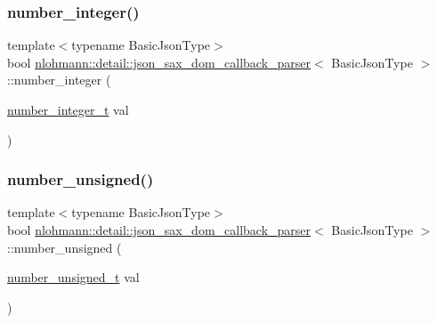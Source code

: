 \subsubsection{\texorpdfstring{number\_integer()}{number\_integer()}}
{\footnotesize\ttfamily template$<$typename Basic\+Json\+Type$>$ \\
bool \mbox{\hyperlink{classnlohmann_1_1detail_1_1json__sax__dom__callback__parser}{nlohmann\+::detail\+::json\+\_\+sax\+\_\+dom\+\_\+callback\+\_\+parser}}$<$ Basic\+Json\+Type $>$\+::number\+\_\+integer (\begin{DoxyParamCaption}\item[{\mbox{\hyperlink{classnlohmann_1_1detail_1_1json__sax__dom__callback__parser_a3ba8fc7a8d83c5b0eeb3b543ad844b8d}{number\+\_\+integer\+\_\+t}}}]{val }\end{DoxyParamCaption})\hspace{0.3cm}{\ttfamily [inline]}}

\mbox{\label{classnlohmann_1_1detail_1_1json__sax__dom__callback__parser_acabb231463bf669441c22e4ea385a9fb}} 
\subsubsection{\texorpdfstring{number\_unsigned()}{number\_unsigned()}}
{\footnotesize\ttfamily template$<$typename Basic\+Json\+Type$>$ \\
bool \mbox{\hyperlink{classnlohmann_1_1detail_1_1json__sax__dom__callback__parser}{nlohmann\+::detail\+::json\+\_\+sax\+\_\+dom\+\_\+callback\+\_\+parser}}$<$ Basic\+Json\+Type $>$\+::number\+\_\+unsigned (\begin{DoxyParamCaption}\item[{\mbox{\hyperlink{classnlohmann_1_1detail_1_1json__sax__dom__callback__parser_a2406c5125f7128fb9c01921df2903001}{number\+\_\+unsigned\+\_\+t}}}]{val }\end{DoxyParamCaption})\hspace{0.3cm}{\ttfamily [inline]}}

\mbox{\label{classnlohmann_1_1detail_1_1json__sax__dom__callback__parser_a5c9603e79a71713f5e8cf12cba837dbb}} 
